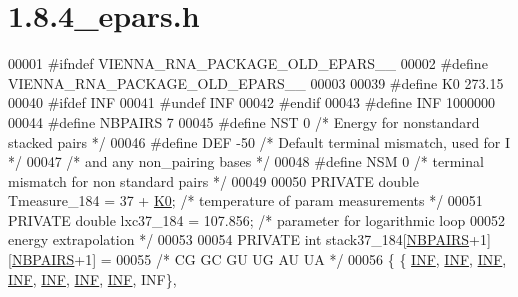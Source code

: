 \hypertarget{1_88_84__epars_8h_source}{}\section{1.8.4\+\_\+epars.h}
\label{1_88_84__epars_8h_source}

\begin{DoxyCode}
00001 \textcolor{preprocessor}{#ifndef VIENNA\_RNA\_PACKAGE\_OLD\_EPARS\_\_}
00002 \textcolor{preprocessor}{#define VIENNA\_RNA\_PACKAGE\_OLD\_EPARS\_\_}
00003 
00039 \textcolor{preprocessor}{#define K0        273.15}
00040 \textcolor{preprocessor}{#ifdef INF}
00041 \textcolor{preprocessor}{#undef INF}
00042 \textcolor{preprocessor}{#endif}
00043 \textcolor{preprocessor}{#define INF       1000000}
00044 \textcolor{preprocessor}{#define NBPAIRS   7}
00045 \textcolor{preprocessor}{#define NST       0     }\textcolor{comment}{/* Energy for nonstandard stacked pairs */}\textcolor{preprocessor}{}
00046 \textcolor{preprocessor}{#define DEF       -50   }\textcolor{comment}{/* Default terminal mismatch, used for I */}\textcolor{preprocessor}{}
00047                         \textcolor{comment}{/* and any non\_pairing bases */}
00048 \textcolor{preprocessor}{#define NSM       0     }\textcolor{comment}{/* terminal mismatch for non standard pairs */}\textcolor{preprocessor}{}
00049 
00050 PRIVATE \textcolor{keywordtype}{double} Tmeasure\_184 = 37 + \hyperlink{energy__const_8h_a307c72605e3713972b4f4fb2d53ea20e}{K0};  \textcolor{comment}{/* temperature of param measurements */}
00051 PRIVATE \textcolor{keywordtype}{double} lxc37\_184    = 107.856;  \textcolor{comment}{/* parameter for logarithmic loop}
00052 \textcolor{comment}{                                           energy extrapolation */}
00053 
00054 PRIVATE \textcolor{keywordtype}{int} stack37\_184[\hyperlink{energy__const_8h_a5e75221c779d618eab81e096f37e32ce}{NBPAIRS}+1][\hyperlink{energy__const_8h_a5e75221c779d618eab81e096f37e32ce}{NBPAIRS}+1] =
00055 \textcolor{comment}{/*          CG     GC     GU     UG     AU     UA  */}
00056 \{ \{  \hyperlink{energy__const_8h_a12c2040f25d8e3a7b9e1c2024c618cb6}{INF},   \hyperlink{energy__const_8h_a12c2040f25d8e3a7b9e1c2024c618cb6}{INF},   \hyperlink{energy__const_8h_a12c2040f25d8e3a7b9e1c2024c618cb6}{INF},   \hyperlink{energy__const_8h_a12c2040f25d8e3a7b9e1c2024c618cb6}{INF},   \hyperlink{energy__const_8h_a12c2040f25d8e3a7b9e1c2024c618cb6}{INF},   \hyperlink{energy__const_8h_a12c2040f25d8e3a7b9e1c2024c618cb6}{INF},   \hyperlink{energy__const_8h_a12c2040f25d8e3a7b9e1c2024c618cb6}{INF}, INF\},

\end{DoxyCode}
